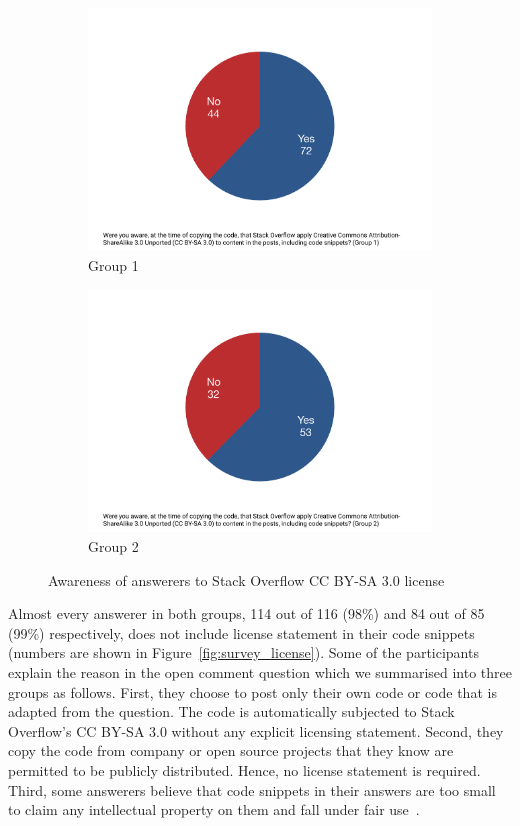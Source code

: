 \documentclass{svjour3}                     %
\begin{document}
\begin{figure}
	\begin{subfigure}{.5\textwidth}
		\centering
		\includegraphics[width=.4\linewidth]{survey_license_known_1}
		\caption{Group 1}
		\label{fig:survey_license_known_1}
	\end{subfigure}%
	\begin{subfigure}{.5\textwidth}
		\centering
		\includegraphics[width=.4\linewidth]{survey_license_known_2}
		\caption{Group 2}
		\label{fig:survey_license_known_2}
	\end{subfigure}
	\caption{Awareness of answerers to Stack Overflow CC BY-SA 3.0 license}
	\label{fig:survey_license_known}
\end{figure}

Almost every answerer in both groups, 114 out of 116 (98\%) and 84 out of 85
(99\%) respectively, does not include license statement in their code snippets
(numbers are shown in Figure~\ref{fig:survey_license}). Some of the participants
explain the reason in the open comment question which we summarised into three
groups as follows. First, they choose to post only their own code or code that
is adapted from the question. The code is automatically subjected to Stack
Overflow's CC BY-SA 3.0 without any explicit licensing statement. Second, they
copy the code from company or open source projects that they know are permitted
to be publicly distributed. Hence, no license statement is required. Third, some
answerers believe that code snippets in their answers are too small to claim any
intellectual property on them and fall under fair use~\citep{fairuse}.
\end{document}
